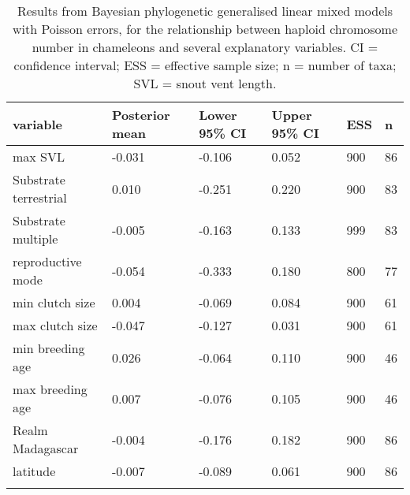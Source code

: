 \begin{longtable}{llllll}

\caption{Results from Bayesian phylogenetic generalised linear mixed models with Poisson errors, for the relationship between haploid chromosome number in chameleons and several explanatory variables. CI = confidence interval; ESS = effective sample size; n = number of taxa; SVL = snout vent length.}\\ 
  
\hline
\textbf{variable} & \textbf{Posterior mean} & \textbf{Lower 95\% CI} & \textbf{Upper 95\% CI} & \textbf{ESS}& \textbf{n} \\
\hline
max SVL &
-0.031 &
-0.106 &
0.052 &
900 &
86 \\
Substrate terrestrial &
0.010 &
-0.251 &
0.220 &
900 &
83\\
Substrate multiple &
-0.005 &
-0.163 &
0.133 &
999 &
83\\
reproductive mode &
-0.054 &
-0.333 &
0.180 &
800 &
77\\
min clutch size &
0.004 &
-0.069 &
0.084 &
900 &
61\\
max clutch size &
-0.047 &
-0.127 &
0.031 &
900 &
61\\
min breeding age &
0.026 &
-0.064 &
0.110 &
900 &
46\\
max breeding age &
0.007 &
-0.076 &
0.105 &
900 &
46\\
Realm Madagascar &
-0.004 &
-0.176 &
0.182 &
900 &
86\\
latitude &
-0.007 &
-0.089 &
0.061&
900 &
86\\

\hline

\label{table-ecology}
\end{longtable}